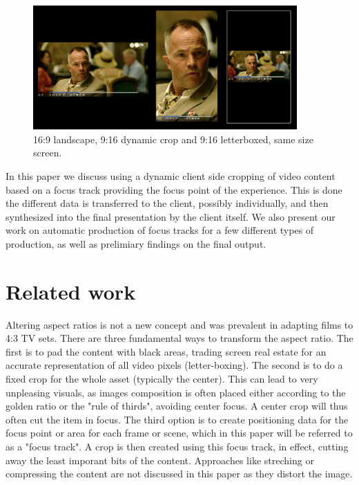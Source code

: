 \documentclass{aircc}
\begin{document}
\begin{figure}
  \begin{center}
    \includegraphics[width=0.9\textwidth]{DAR_vs_letterbox.png}
  \end{center}
  \caption{16:9 landscape, 9:16 dynamic crop and 9:16 letterboxed, same size screen.}
  \label{croppings}
\end{figure}

In this paper we discuss using a dynamic client side cropping of video content
based on a focus track providing the focus point of the experience. This is
done the different data is transferred to the client, possibly individually,
and then synthesized into the final presentation by the client itself. We
also present our work on automatic production of focus tracks for a few
different types of production, as well as prelimiary findings on the final
output.

\section{Related work}

Altering aspect ratios is not a new concept and was prevalent in adapting
films to 4:3 TV sets. There are three fundamental ways to transform the
aspect ratio. The first is to pad the content with black areas, trading
screen real estate for an accurate representation of all video pixels
(letter-boxing). The second is to do a fixed crop for the whole asset
(typically the center). This can lead to very unpleasing visuals, as images
composition is often placed either according to the golden ratio or the "rule
of thirds", avoiding center focus. A center crop will thus often cut the item
in focus. The third option is to create positioning data for the focus point
or area for each frame or scene, which in this paper will be referred to as
a "focus track". A crop is then created using this focus track, in effect,
cutting away the least imporant bits of the content. Approaches like
streching or compressing the content are not discussed in this paper as they
distort the image.
\end{document}
